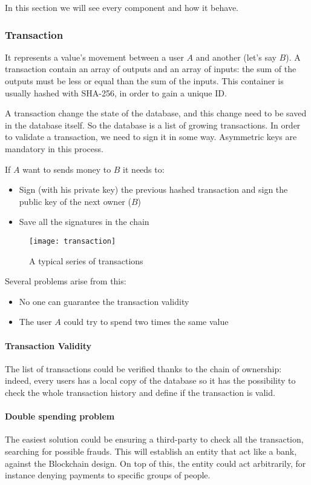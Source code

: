 In this section we will see every component and how it behave.

\subsubsection{Transaction}
It represents a value's movement between a user $A$ and another (let's
say $B$). A transaction contain an array of outputs and an array of
inputs\cite{sok15}: the sum of the outputs must be less or equal than the sum of
the inputs. This container is usually hashed with SHA-256, in order to gain a
unique ID.

A transaction change the state of the database, and this change need to be saved
in the database itself. So the database is a list of growing transactions.
In order to validate a transaction, we need to sign it in some way. Asymmetric
keys are mandatory in this process.

If $A$ want to sends money to $B$ it needs to:
\begin{itemize}
 \item Sign (with his private key) the previous hashed transaction and sign the
public key of the next owner ($B$)
 \item Save all the signatures in the chain
\end{itemize}

\begin{figure}[h]
 \centering
 \texttt{[image: transaction]}
 \caption{A typical series of transactions}
\end{figure}

Several problems arise from this:
\begin{itemize}
 \item No one can guarantee the transaction validity
 \item The user $A$ could try to spend two times the same value
\end{itemize}

\paragraph*{Transaction Validity}
The list of transactions could be verified thanks to the chain of ownership:
indeed, every users has a local copy of the database so it has the possibility
to check the whole transaction history and define if the transaction is valid.

\paragraph*{Double spending problem}
The easiest solution could be ensuring a third-party to check all the
transaction, searching for possible frauds. This will establish an entity
that act like a bank, against the Blockchain design. On top of this,
the entity could act arbitrarily, for instance denying payments to specific
groups of people.

